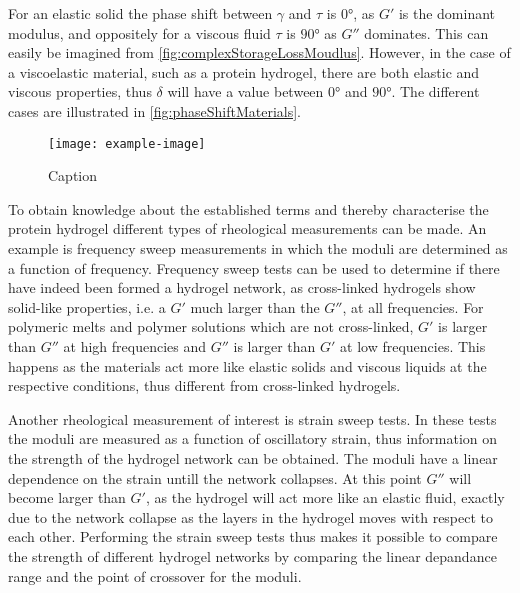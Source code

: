 For an elastic solid the phase shift between $\gamma$ and $\tau$ is $0\si{\degree}$, as $G'$ is the dominant modulus, and oppositely for a viscous fluid $\tau$ is $90\si{\degree}$ as $G''$ dominates. This can easily be imagined from \autoref{fig:complexStorageLossMoudlus}. However, in the case of a viscoelastic material, such as a protein hydrogel, there are both elastic and viscous properties, thus $\delta$ will have a value between $0\si{\degree}$ and $90\si{\degree}$. The different cases are illustrated in \autoref{fig:phaseShiftMaterials}. \parencite{PanahiReza2019ProteinHydrogels}
\par
%
\begin{figure}[tbp]
    \centering
    \texttt{[image: example-image]}
    \caption{Caption}
    \label{fig:phaseShiftMaterials}
\end{figure}
%
To obtain knowledge about the established terms and thereby characterise the protein hydrogel different types of rheological measurements can be made. An example is frequency sweep measurements in which the moduli are determined as a function of frequency. Frequency sweep tests can be used to determine if there have indeed been formed a hydrogel network, as cross-linked hydrogels show solid-like properties, i.e. a $G'$ much larger than the $G''$, at all frequencies. For polymeric melts and polymer solutions which are not cross-linked, $G'$ is larger than $G''$ at high frequencies and $G''$ is larger than $G'$ at low frequencies. This happens as the materials act more like elastic solids and viscous liquids at the respective conditions, thus different from cross-linked hydrogels. \parencite{PanahiReza2019ProteinHydrogels}
\par
%
Another rheological measurement of interest is strain sweep tests. In these tests the moduli are measured as a function of oscillatory strain, thus information on the strength of the hydrogel network can be obtained. The moduli have a linear dependence on the strain untill the network collapses. At this point $G''$ will become larger than $G'$, as the hydrogel will act more like an elastic fluid, exactly due to the network collapse as the layers in the hydrogel moves with respect to each other. Performing the strain sweep tests thus makes it possible to compare the strength of different hydrogel networks by comparing the linear depandance range and the point of crossover for the moduli. 
\parencite{PanahiReza2019ProteinHydrogels, Seidler2017nativeProteinHydrogels} 
\par
%
